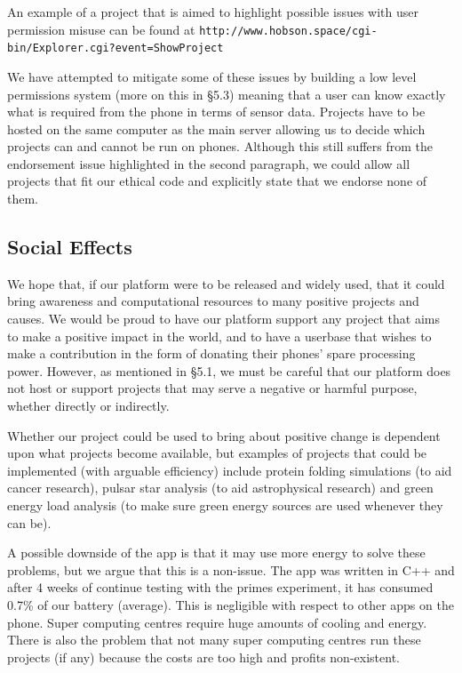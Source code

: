 \documentclass{article}
\begin{document}
An example of a project that is aimed to highlight possible issues with user permission misuse can be found at 
\texttt{http://www.hobson.space/cgi-bin/Explorer.cgi?event=ShowProject}

We have attempted to mitigate some of these issues by building a low level permissions system (more on this in §5.3) meaning that a user can
know exactly what is required from the phone in terms of sensor data. Projects have to be hosted on the same computer as the main server
allowing us to decide which projects can and cannot be run on phones. Although this still suffers from the endorsement issue highlighted in
the second paragraph, we could allow all projects that fit our ethical code and explicitly state that we endorse none of them.

\subsection{Social Effects}
We hope that, if our platform were to be released and widely used, that it could bring awareness and computational resources to many positive
projects and causes. We would be proud to have our platform support any project that aims to make a positive impact in the world, and to have
a userbase that wishes to make a contribution in the form of donating their phones’ spare processing power. However, as mentioned in
§5.1, we must be careful that our platform does not host or support projects that may serve a negative or harmful purpose, whether directly or
indirectly.

Whether our project could be used to bring about positive change is dependent upon what projects become available, but examples of projects
that could be implemented (with arguable efficiency) include protein folding simulations (to aid cancer research), pulsar star analysis
(to aid astrophysical research) and green energy load analysis (to make sure green energy sources are used whenever they can be).

A possible downside of the app is that it may use more energy to solve these problems, but we argue that this is a non-issue. The app was
written in C++ and after 4 weeks of continue testing with the primes experiment, it has consumed 0.7\% of our battery (average). This is
negligible with respect to other apps on the phone. Super computing centres require huge amounts of cooling and energy. There is also the
problem that not many super computing centres run these projects (if any) because the costs are too high and profits non-existent.
\end{document}
